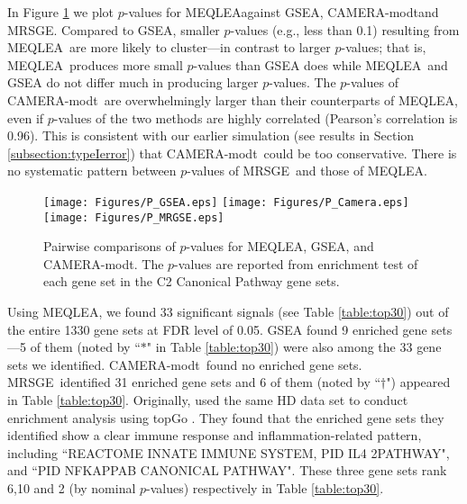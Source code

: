 \documentclass[useAMS,usenatbib, galley]{biom}
\newcommand{\OurMethod}{MEQLEA}
\newcommand{\CMT}{CAMERA-modt}
\newcommand{\genr}{MRSGE}
\begin{document}
	 In Figure \ref{fig:HDdatap} we plot $p$-values for \OurMethod against GSEA, \CMT and \genr. Compared to GSEA, smaller $p$-values (e.g., less than 0.1) resulting from \OurMethod~are more likely to cluster---in contrast to larger $p$-values; that is, \OurMethod~produces more small $p$-values than GSEA does while \OurMethod~and GSEA do not differ much in producing larger $p$-values. The $p$-values of \CMT~are overwhelmingly larger than their counterparts of \OurMethod, even if $p$-values of the two methods are highly correlated (Pearson's correlation is 0.96). This is consistent with our earlier simulation (see results in Section \ref{subsection:typeIerror}) that \CMT~could be too conservative. There is no systematic pattern between $p$-values of \genr~and those of \OurMethod. 
\begin{figure}
	\begin{center}
		\texttt{[image: Figures/P\_GSEA.eps]}
		\texttt{[image: Figures/P\_Camera.eps]}
		\texttt{[image: Figures/P\_MRGSE.eps]}
	\end{center} 
		\caption{Pairwise comparisons of $p$-values for \OurMethod, GSEA, and \CMT. The $p$-values are reported from enrichment test of each gene set in the C2 Canonical Pathway gene sets. }\label{fig:HDdatap}
\end{figure} 
	
	
		Using \OurMethod, we found 33 significant signals (see Table \ref{table:top30}) out of the entire 1330 gene sets at FDR level of 0.05. GSEA found 9 enriched gene sets---5 of them (noted by ``$\ast$" in Table \ref{table:top30})  were also among the 33 gene sets we identified. \CMT~found no enriched gene sets. \genr~identified 31 enriched gene sets and 6 of them (noted by ``$\dagger$") appeared in Table \ref{table:top30}. Originally, \cite{labadorf2015rna} used the same HD data set to conduct enrichment analysis using topGo \citep{alexa2010topgo}. They found that the enriched gene sets they identified show a clear immune response and inflammation-related pattern, including ``REACTOME INNATE IMMUNE SYSTEM, PID IL4 2PATHWAY", and ``PID NFKAPPAB CANONICAL PATHWAY". These three gene sets rank 6,10 and 2 (by nominal $p$-values) respectively in Table \ref{table:top30}.
		
\end{document}
